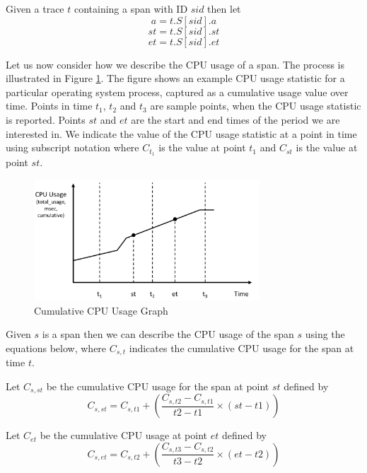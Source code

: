Given a trace $t$ containing a span with ID $sid$ then let
\begin{equation}
a = t.S[sid].a
\end{equation}
\begin{equation}
st = t.S[sid].st
\end{equation}
\begin{equation}
et = t.S[sid].et
\end{equation}

Let us now consider how we describe the CPU usage of a span.  The process is illustrated in Figure \ref{figure:graph}.  The figure shows an example CPU usage statistic for a particular operating system process, captured as a cumulative usage value over time.  Points in time $t_{1}$, $t_{2}$ and $t_{3}$ are sample points, when the CPU usage statistic is reported.  Points $st$ and $et$ are the start and end times of the period we are interested in.  We indicate the value of the CPU usage statistic at a point in time using subscript notation where $C_{t_{1}}$ is the value at point $t_{1}$ and $C_{st}$ is the value at point $st$.

\begin{figure}
\centering
\includegraphics[width=0.75\textwidth]{Figures/estimating-energy-graph}
\caption{Cumulative CPU Usage Graph}
\label{figure:graph}
\end{figure}

Given $s$ is a span then we can describe the CPU usage of the span $s$ using the equations below, where $C_{s,t}$ indicates the cumulative CPU usage for the span at time $t$.

Let $C_{s, st}$ be the cumulative CPU usage for the span at point $st$ defined by
\begin{equation}
C_{s,st} = C_{s,t1} + ( \frac{C_{s,t2} - C_{s,t1}}{t2 - t1} \times (st - t1) ) 
\end{equation}

Let $C_{et}$ be the cumulative CPU usage at point $et$ defined by
\begin{equation}
C_{s,et} = C_{s,t2} + ( \frac{C_{s,t3} - C_{s,t2}}{t3 - t2} \times (et - t2) ) 
\end{equation}

